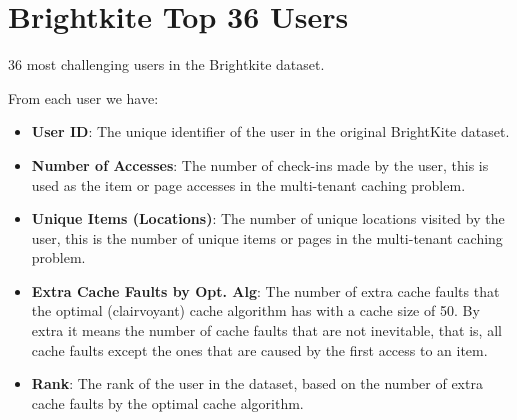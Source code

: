\chapter{Brightkite Top 36 Users}
\label{appendix:brightike-top-36-users}

\begin{table}[ht]
    \centering
    \small
    \caption{36 most challenging users in the Brightkite dataset.}
    \label{tab:brightkite-top-36-users}
\end{table}

\newpage

From each user we have:

\begin{itemize}
    \item \textbf{User ID}: The unique identifier of the user in the original BrightKite dataset.
    \item \textbf{Number of Accesses}: The number of check-ins made by the user, this is used as the 
    item or page accesses in the multi-tenant caching problem.
    \item \textbf{Unique Items (Locations)}: The number of unique locations visited by the user, this is
    the number of unique items or pages in the multi-tenant caching problem.
    \item \textbf{Extra Cache Faults by Opt. Alg}: The number of extra cache faults that the optimal
    (clairvoyant) cache algorithm has with a cache size of 50. By extra it means the number of cache
    faults that are not inevitable, that is, all cache faults except the ones that are caused by the 
    first access to an item.
    \item \textbf{Rank}: The rank of the user in the dataset, based on the number of extra cache faults
    by the optimal cache algorithm.
\end{itemize}